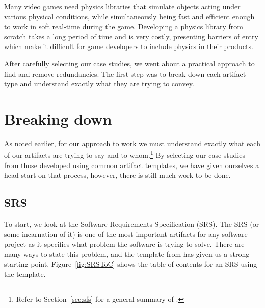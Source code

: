 \card{\gp}
{Many video games need physics libraries that simulate 
 objects acting under various physical conditions, while simultaneously being 
 fast and efficient enough to work in soft real-time during the game. 
 Developing a physics library from scratch takes a long period of time and is 
 very costly, presenting barriers of entry which make it difficult for game 
 developers to include physics in their products.}
{}

After carefully selecting our case studies, we went about a practical approach
to find and remove redundancies. The first step was to break down each artifact
type and understand exactly what they are trying to convey.


\section{Breaking down \sfs}
\label{sec:breakdown}

As noted earlier, for our approach to work we must understand exactly what each
of our artifacts are trying to say and to whom.\footnote{Refer to 
Section~\ref{sec:sfs} for a general summary of \sfs{}.} By selecting our case 
studies from those developed using common artifact templates, we have given 
ourselves a head start on that process, however, there is still much work to be 
done.

\subsection{SRS}

To start, we look at the Software Requirements Specification (SRS). The SRS
(or some incarnation of it) is one of the most important artifacts for any
software project as it specifies what problem the software is trying to solve.
There are many ways to state this problem, and the template from \smithea{} has 
given us a strong starting point. Figure~\ref{fig:SRSToC} shows the table of 
contents for an SRS using the \smithea{} template.

